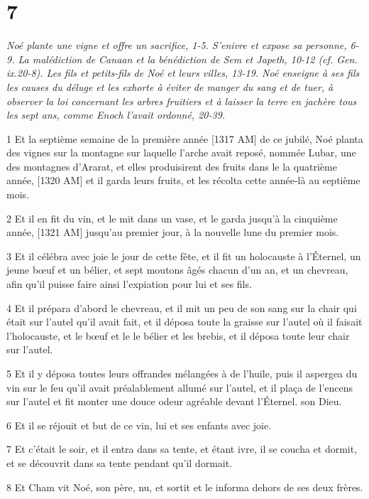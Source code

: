 \chapter{7}

\par \textit{Noé plante une vigne et offre un sacrifice, 1-5. S'enivre et expose sa personne, 6-9. La malédiction de Canaan et la bénédiction de Sem et Japeth, 10-12 (cf. Gen. ix.20-8). Les fils et petits-fils de Noé et leurs villes, 13-19. Noé enseigne à ses fils les causes du déluge et les exhorte à éviter de manger du sang et de tuer, à observer la loi concernant les arbres fruitiers et à laisser la terre en jachère tous les sept ans, comme Enoch l'avait ordonné, 20-39.}

\par 1 Et la septième semaine de la première année [1317 AM] de ce jubilé, Noé planta des vignes sur la montagne sur laquelle l'arche avait reposé, nommée Lubar, une des montagnes d'Ararat, et elles produisirent des fruits dans le la quatrième année, [1320 AM] et il garda leurs fruits, et les récolta cette année-là au septième mois.
\par 2 Et il en fit du vin, et le mit dans un vase, et le garda jusqu'à la cinquième année, [1321 AM] jusqu'au premier jour, à la nouvelle lune du premier mois.
\par 3 Et il célébra avec joie le jour de cette fête, et il fit un holocauste à l'Éternel, un jeune bœuf et un bélier, et sept moutons âgés chacun d'un an, et un chevreau, afin qu'il puisse faire ainsi l'expiation pour lui et ses fils.
\par 4 Et il prépara d'abord le chevreau, et il mit un peu de son sang sur la chair qui était sur l'autel qu'il avait fait, et il déposa toute la graisse sur l'autel où il faisait l'holocauste, et le bœuf et le le bélier et les brebis, et il déposa toute leur chair sur l'autel.
\par 5 Et il y déposa toutes leurs offrandes mélangées à de l'huile, puis il aspergea du vin sur le feu qu'il avait préalablement allumé sur l'autel, et il plaça de l'encens sur l'autel et fit monter une douce odeur agréable devant l'Éternel. son Dieu.
\par 6 Et il se réjouit et but de ce vin, lui et ses enfants avec joie.
\par 7 Et c'était le soir, et il entra dans sa tente, et étant ivre, il se coucha et dormit, et se découvrit dans sa tente pendant qu'il dormait.
\par 8 Et Cham vit Noé, son père, nu, et sortit et le informa dehors de ses deux frères.
